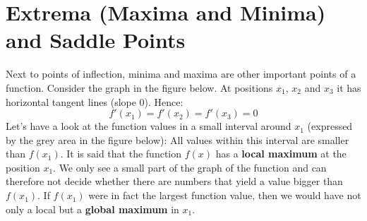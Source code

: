 \documentclass[12pt,eng]{skript_ogg}
\begin{document}
\section{Extrema (Maxima and Minima) and Saddle Points}
Next to points of inflection, minima and maxima are other important points of a function. Consider the graph in the figure below. At positions $x_1$, $x_2$ and $x_3$ it has horizontal tangent lines (slope $0$). Hence:
\[f'(x_1)=f'(x_2)=f'(x_3)=0\]
Let's have a look at the function values in a small interval around $x_1$ (expressed by the grey area in the figure below): All values within this interval are smaller than $f(x_1)$. It is said that the function $f(x)$ has a \textbf{local maximum} at the position $x_1$. We only see a small part of the graph of the function and can therefore not decide whether there are numbers that yield a value bigger than $f(x_1)$. If $f(x_1)$ were in fact the largest function value, then we would have not only a local but a \textbf{global maximum} in $x_1$. 
\end{document}

